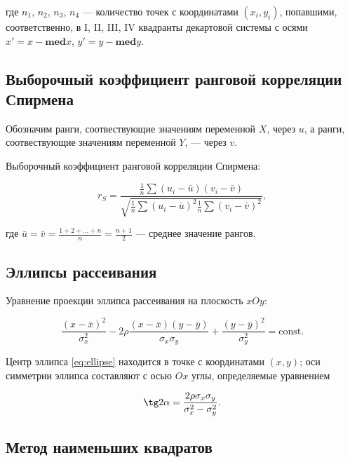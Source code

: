 \documentclass[12pt,a4paper]{article}
\begin{document}
	где \( n_1 \), \( n_2 \), \( n_3 \), \( n_4 \) — количество точек с
	координатами \( (x_i, y_i) \), попавшими, соответственно, в I, II, III, IV
	квадранты декартовой системы с осями \( x' = x - \mathbf{med}x \),
	\( y' = y - \mathbf{med}y \).

	\subsection{Выборочный коэффициент ранговой корреляции Спирмена}

	Обозначим ранги, соотвествующие значениям переменной \( X \), через
	\( u \), а ранги, соотвествующие значениям переменной \( Y \), — через
	\( v \).

	Выборочный коэффициент ранговой корреляции Спирмена:

	\begin{equation}  \label{eq:spearman_corr}
		r_S = \frac{\frac{1}{n} \sum (u_i - \bar u)(v_i - \bar v)}{\sqrt{\frac{1}{n}
		\sum (u_i - \bar u)^2 \frac{1}{n} \sum (v_i - \bar v)^2}},
	\end{equation}

	где \( \bar u = \bar v = \frac{1 + 2 + \dots + n}{n} = \frac{n + 1}{2} \) —
	среднее значение рангов.

	\subsection{Эллипсы рассеивания}

	Уравнение проекции эллипса рассеивания на плоскость \( xOy \):

	\begin{equation}  \label{eq:ellipse}
		\frac{(x - \bar x)^2}{\sigma_x^2} - 2 \rho \frac{(x - \bar x)(y - \bar y)}
		{\sigma_x \sigma_y} + \frac{(y - \bar y)^2}{\sigma_y^2} = \text{const}.
	\end{equation}

	Центр эллипса \ref{eq:ellipse} находится в точке с координатами
	\( (x, y) \); оси симметрии эллипса составляют с осью \( Ox \) углы,
	определяемые уравнением

	\begin{equation}  \label{eq:ellipse}
		\tg 2 \alpha = \frac{2 \rho \sigma_x \sigma_y}{\sigma_x^2 - \sigma_y^2}.
	\end{equation}

	\subsection{Метод наименьших квадратов}
\end{document}
